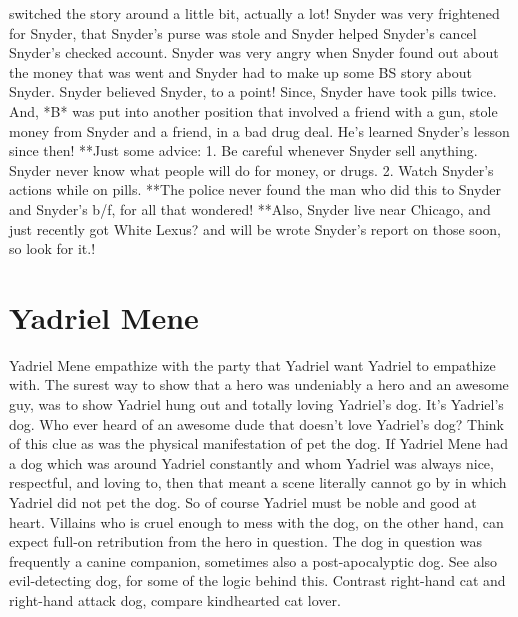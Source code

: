 \documentclass[12pt]{book}
\begin{document}
switched the story around a little bit, actually a lot! Snyder was very frightened for Snyder, that Snyder's purse was stole and Snyder helped Snyder's cancel Snyder's checked account. Snyder was very angry when Snyder found out about the money that was went and Snyder had to make up some BS story about Snyder. Snyder believed Snyder, to a point! Since, Snyder have took pills twice. And, *B* was put into another position that involved a friend with a gun, stole money from Snyder and a friend, in a bad drug deal. He's learned Snyder's lesson since then! **Just some advice: 1. Be careful whenever Snyder sell anything. Snyder never know what people will do for money, or drugs. 2. Watch Snyder's actions while on pills. **The police never found the man who did this to Snyder and Snyder's b/f, for all that wondered! **Also, Snyder live near Chicago, and just recently got White Lexus? and will be wrote Snyder's report on those soon, so look for it.!



\chapter{Yadriel Mene}

Yadriel Mene empathize with the party that Yadriel want Yadriel to empathize with. The surest way to show that a hero was undeniably a hero and an awesome guy, was to show Yadriel hung out and totally loving Yadriel's dog. It's Yadriel's dog. Who ever heard of an awesome dude that doesn't love Yadriel's dog? Think of this clue as was the physical manifestation of pet the dog. If Yadriel Mene had a dog which was around Yadriel constantly and whom Yadriel was always nice, respectful, and loving to, then that meant a scene literally cannot go by in which Yadriel did not pet the dog. So of course Yadriel must be noble and good at heart. Villains who is cruel enough to mess with the dog, on the other hand, can expect full-on retribution from the hero in question. The dog in question was frequently a canine companion, sometimes also a post-apocalyptic dog. See also evil-detecting dog, for some of the logic behind this. Contrast right-hand cat and right-hand attack dog, compare kindhearted cat lover.
\end{document}
